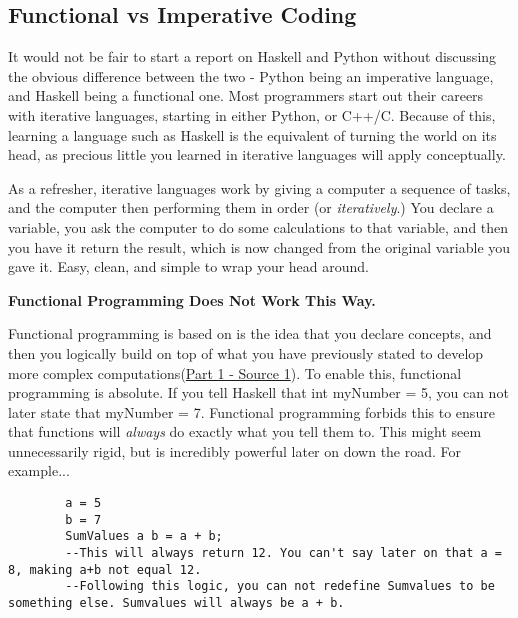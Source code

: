 \documentclass{article}
\begin{document}
    \subsection{Functional vs Imperative Coding}
    It would not be fair to start a report on Haskell and Python without discussing the obvious difference between the two - Python being an imperative language, and Haskell being a functional one. Most programmers start out their careers with iterative languages, starting in either Python, or C++/C. Because of this, learning a language such as Haskell is the equivalent of turning the world on its head, as precious little you learned in iterative languages will apply conceptually. 

    \medskip\noindent As a refresher, iterative languages work by giving a computer a sequence of tasks, and the computer then performing them in order (or \textit{iteratively}.) You declare a variable, you ask the computer to do some calculations to that variable, and then you have it return the result, which is now changed from the original variable you gave it. Easy, clean, and simple to wrap your head around. 
    
    \medskip\noindent\textbf{Functional Programming Does Not Work This Way.} 
    
    \medskip\noindent Functional programming is based on is the idea that you declare concepts, and then you logically build on top of what you have previously stated to develop more complex computations(\href {http://learnyouahaskell.com/introduction}{Part 1 - Source 1}). To enable this, functional programming is absolute. If you tell Haskell that int myNumber = 5, you can not later state that myNumber = 7. Functional programming forbids this to ensure that functions will \textit{always} do exactly what you tell them to. This might seem unnecessarily rigid, but is incredibly powerful later on down the road. For example...
        \begin{lstlisting}
        a = 5
        b = 7
        SumValues a b = a + b; 
        --This will always return 12. You can't say later on that a = 8, making a+b not equal 12. 
        --Following this logic, you can not redefine Sumvalues to be something else. Sumvalues will always be a + b. 
        \end{lstlisting}
        
\end{document}
